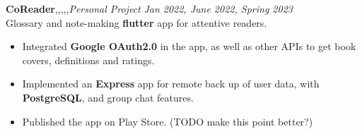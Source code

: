 \textbf{CoReader}\sep\flutter\sep\dart\sep\py\sep\django\sep{\it Personal Project} \hfill{\sl \small Jan 2022, June 2022, Spring 2023}\\
\vspace{-8pt}
\emerrow Glossary and note-making {\bf flutter} app for attentive readers.
\begin{itemize}[itemsep = -1.7 mm, leftmargin=*]
\item Integrated {\bf Google OAuth2.0} in the app, as well as other APIs to get book covers, definitions and ratings.
\item Implemented an {\bf Express } app for remote back up of user data, with \textbf{PostgreSQL}, and group chat features.
\item Published the app on Play Store. (TODO make this point better?)
\end{itemize}
